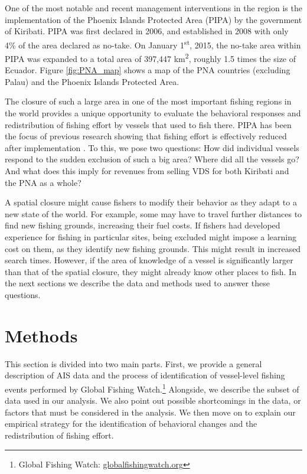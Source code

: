 \documentclass[9p,twocolumn,twoside,lineno]{pnas-new}
\begin{document}
One of the most notable and recent management interventions in the
region is the implementation of the Phoenix Islands Protected Area (PIPA)
by the government of Kiribati. PIPA was first declared in 2006, and
established in 2008 with only 4\% of the area declared as no-take. On
January 1\textsuperscript{st}, 2015, the no-take area within PIPA was
expanded to a total area of 397,447 km\textsuperscript{2}, roughly 1.5
times the size of Ecuador. Figure \ref{fig:PNA_map} shows a map of the
PNA countries (excluding Palau) and the Phoenix Islands Protected Area.

The closure of such a large area in one of the most important fishing
regions in the world provides a unique opportunity to evaluate the
behavioral responses and redistribution of fishing effort by vessels
that used to fish there. PIPA has been the focus of previous research
showing that fishing effort is effectively reduced after implementation
\citep{mccauley_2016,mcdermott_2018}. To this, we pose two questions:
How did individual vessels respond to the sudden exclusion of such a big
area? Where did all the vessels go? And what does this imply for revenues from
selling VDS for both Kiribati and the PNA as a whole? 

A spatial closure might cause fishers to modify
their behavior as they adapt to a new state of the world. For example, some may have
to travel further distances to find new fishing grounds, increasing their fuel
costs. If fishers had developed experience for fishing in particular
sites, being excluded might impose a learning cost on them, as they
identify new fishing grounds. This might result in increased search
times. However, if the area of knowledge of a vessel is significantly
larger than that of the spatial closure, they might already know other
places to fish. In the next sections we describe
the data and methods used to answer these questions.

\clearpage

\section{Methods}\label{methods}

This section is divided into two main parts. First, we provide a general
description of AIS data and the process of identification of
vessel-level fishing events performed by Global Fishing Watch.\footnote{Global Fishing Watch: \url{globalfishingwatch.org}}
Alongside, we describe
the subset of data used in our analysis. We also point
out possible shortcomings in the data, or factors that must be
considered in the analysis. We then move on to explain our
empirical strategy for the identification of behavioral changes and
the redistribution of fishing effort.
\end{document}

